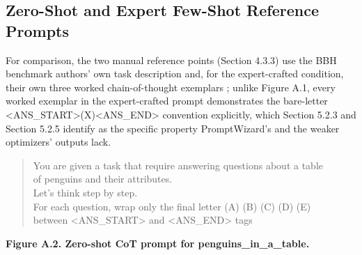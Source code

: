 \documentclass[a4paper,fleqn]{cas-sc}
\begin{document}
\subsection{Zero-Shot and Expert Few-Shot Reference Prompts}

For comparison, the two manual reference points (Section 4.3.3) use the BBH benchmark authors' own task description and, for the expert-crafted condition, their own three worked chain-of-thought exemplars \citep{suzgun2023}; unlike Figure A.1, every worked exemplar in the expert-crafted prompt demonstrates the bare-letter <ANS\_\allowbreak{}START>(X)<ANS\_\allowbreak{}END> convention explicitly, which Section 5.2.3 and Section 5.2.5 identify as the specific property PromptWizard's and the weaker optimizers' outputs lack.

\centering
\begin{quote}\ttfamily\small
You are given a task that require answering questions about a table\\{}
of penguins and their attributes.\\{}
Let's think step by step.\\{}
For each question, wrap only the final letter (A) (B) (C) (D) (E)\\{}
between <ANS\_\allowbreak{}START> and <ANS\_\allowbreak{}END> tags\\{}
\end{quote}
\par\noindent\textbf{Figure A.2. Zero-shot CoT prompt for penguins\_\allowbreak{}in\_\allowbreak{}a\_\allowbreak{}table.}
\end{document}
